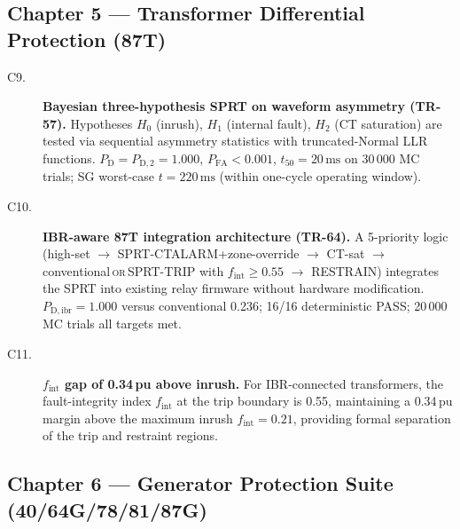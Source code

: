 \documentclass
    [phd,synopsis]
    {iitmdissertation}
\newcommand{\ms}{\,\text{ms}}
\newcommand{\PD}{P_{\mathrm{D}}}
\newcommand{\PFA}{P_{\mathrm{FA}}}
\begin{document}
\subsection*{Chapter 5 — Transformer Differential Protection (87T)}

\begin{description}
  \item[C9.] \textbf{Bayesian three-hypothesis SPRT on waveform asymmetry
    (TR-57).}
    Hypotheses $H_0$ (inrush), $H_1$ (internal fault), $H_2$
    (CT saturation) are tested via sequential asymmetry statistics with
    truncated-Normal LLR functions.
    $\PD = P_{\mathrm{D},2} = 1.000$, $\PFA < 0.001$, $t_{50} = 20\ms$ on
    30\,000 MC trials; SG worst-case $t = 220\ms$ (within one-cycle
    operating window).

  \item[C10.] \textbf{IBR-aware 87T integration architecture (TR-64).}
    A 5-priority logic (high-set $\to$ SPRT-CTALARM+zone-override $\to$
    CT-sat $\to$ conventional\,\textsc{or}\,SPRT-TRIP with
    $f_{\mathrm{int}} \geq 0.55$ $\to$ RESTRAIN) integrates the SPRT into
    existing relay firmware without hardware modification.
    $P_{\mathrm{D,ibr}} = 1.000$ versus conventional 0.236;
    16/16 deterministic PASS; 20\,000 MC trials all targets met.

  \item[C11.] \textbf{$f_{\mathrm{int}}$ gap of 0.34\,pu above inrush.}
    For IBR-connected transformers, the fault-integrity index
    $f_{\mathrm{int}}$ at the trip boundary is 0.55, maintaining a
    0.34\,pu margin above the maximum inrush $f_{\mathrm{int}} = 0.21$,
    providing formal separation of the trip and restraint regions.
\end{description}

\subsection*{Chapter 6 — Generator Protection Suite (40/64G/78/81/87G)}
\end{document}
